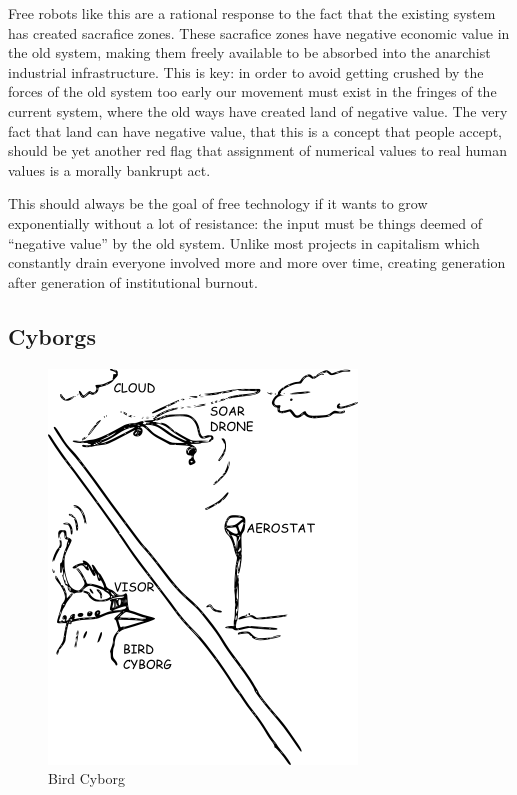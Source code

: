 Free robots like this are a rational response to the fact that the
existing system has created sacrafice zones. These sacrafice zones have
negative economic value in the old system, making them freely available
to be absorbed into the anarchist industrial infrastructure. This is
key: in order to avoid getting crushed by the forces of the old system
too early our movement must exist in the fringes of the current system,
where the old ways have created land of negative value. The very fact
that land can have negative value, that this is a concept that people
accept, should be yet another red flag that assignment of numerical
values to real human values is a morally bankrupt act.

This should always be the goal of free technology if it wants to grow
exponentially without a lot of resistance: the input must be things
deemed of ``negative value'' by the old system. Unlike most projects in
capitalism which constantly drain everyone involved more and more over
time, creating generation after generation of institutional burnout.

\subsection{Cyborgs}\label{cyborgs}

\begin{figure}[htbp]
\centering
\includegraphics{images/birdcyborg.png}
\caption{Bird Cyborg}
\end{figure}

